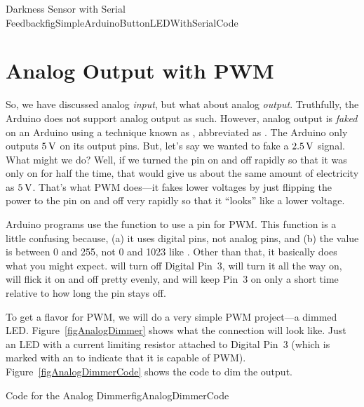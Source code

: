 \begin{typingwithlabel}{Darkness Sensor with Serial Feedback}{figSimpleArduinoButtonLEDWithSerialCode}

\end{typingwithlabel}

\section{Analog Output with PWM}

So, we have discussed analog \emph{input}, but what about analog \emph{output}.
Truthfully, the Arduino does not support analog output as such.
However, analog output is \emph{faked} on an Arduino using a technique known as , abbreviated as .
The Arduino only outputs $5\,\si{\volt}$ on its output pins.
But, let's say we wanted to fake a $2.5\,\si{\volt}$ signal.
What might we do?
Well, if we turned the pin on and off rapidly so that it was only on for half the time, that would give us about the same amount of electricity as $5\,\si{\volt}$.
That's what PWM does---it fakes lower voltages by just flipping the power to the pin on and off very rapidly so that it ``looks'' like a lower voltage.

Arduino programs use the function  to use a pin for PWM.
This function is a little confusing because, (a) it uses digital pins, not analog pins, and (b) the value is between 0 and 255, not 0 and 1023 like .
Other than that, it basically does what you might expect.
 will turn off Digital Pin~3,  will turn it all the way on,  will flick it on and off pretty evenly, and  will keep Pin~3 on only a short time relative to how long the pin stays off.


To get a flavor for PWM, we will do a very simple PWM project---a dimmed LED.
Figure~\ref{figAnalogDimmer} shows what the connection will look like.
Just an LED with a current limiting resistor attached to Digital Pin~3 (which is marked with an \icode{~} to indicate that it is capable of PWM).
Figure~\ref{figAnalogDimmerCode} shows the code to dim the output.

\begin{typingwithlabel}{Code for the Analog Dimmer}{figAnalogDimmerCode}

\end{typingwithlabel}

